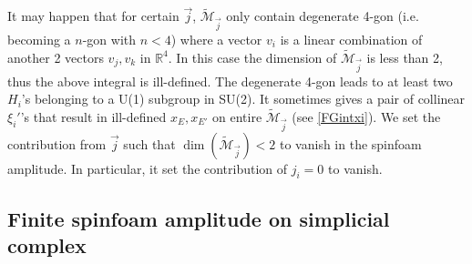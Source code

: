 \documentclass[aps,prd,notitlepage,nofootinbib,superscriptaddress,groupedaddress,twocolumn]{revtex4-1}
\def\R{\mathbb{R}}
\newcommand{\Su}{\mathrm{SU}(2)}
\newcommand{\PSu}{\mathrm{PSU}(2)}
\newcommand{\cm}{\mathcal M}
\begin{document}


It may happen that for certain $\vec{j}$, $\widetilde{\cm}_{\vec{j}}$ only contain degenerate 4-gon (i.e. becoming a $n$-gon with $n<4$) where a vector $v_i$ is a linear combination of another 2 vectors $v_j,v_k$ in $\R^4$. In this case the dimension of $\widetilde{\cm}_{\vec{j}}$ is less than 2, thus the above integral is ill-defined.
The degenerate 4-gon leads to at least two $H_i$'s belonging to a U(1) subgroup in SU(2). It sometimes gives a pair of collinear $\xi_i'$'s that result in ill-defined $x_E,x_{E'}$ on entire $\widetilde{\cm}_{\vec{j}}$ (see \eqref{FGintxi}). 
We set the contribution from $\vec{j}$ such that $\dim(\widetilde{\cm}_{\vec{j}})<2$ to vanish in the spinfoam amplitude. In particular, it set the contribution of $j_{i}=0$ to vanish.












 
 
\subsection{Finite spinfoam amplitude on simplicial complex }
 
\end{document}
